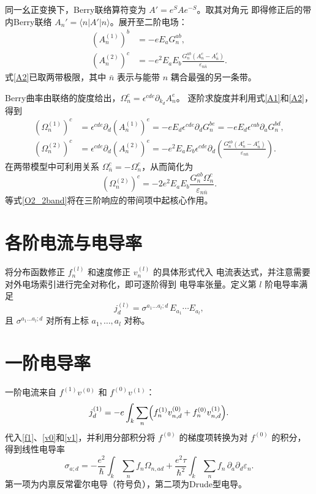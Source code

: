 同一幺正变换下，Berry联络算符变为 \(A' = e^S A e^{-S}\)。取其对角元
即得修正后的带内Berry联络 \(A_n' = \langle n|A'|n\rangle\)。展开至二阶电场：
\begin{align}
  (A_n^{(1)})^b &= -e E_a G_n^{ab}, \label{A1}\\
  (A_n^{(2)})^c &= -e^2 E_a E_b \frac{G_n^{ab}(A_n^c - A_{\bar n}^c)}{\varepsilon_{n\bar n}}.
  \label{A2}
\end{align}
式\eqref{A2}已取两带极限，其中 \(\bar n\) 表示与能带 \(n\) 耦合最强的另一条带。

Berry曲率由联络的旋度给出，\(\Omega_n^c = \epsilon^{cde}\partial_{k_d} A_n^e\)。
逐阶求旋度并利用式\eqref{A1}和\eqref{A2}，得到
\begin{align}
  (\Omega_n^{(1)})^c &= \epsilon^{cde}\partial_d (A_n^{(1)})^e
    = -e E_d \epsilon^{cde}\partial_d G_n^{be}
    = -e E_d \epsilon^{cab}\partial_a G_n^{bd}, \label{O1}\\
  (\Omega_n^{(2)})^c &= \epsilon^{cde}\partial_d (A_n^{(2)})^e
    = -e^2 E_a E_b \epsilon^{cde}\partial_d\!
    \left( \frac{G_n^{ab}(A_n^e - A_{\bar n}^e)}{\varepsilon_{n\bar n}} \right).
\end{align}
在两带模型中可利用关系 \(\Omega_{\bar n}^c = -\Omega_n^c\)，从而简化为
\begin{equation}
  (\Omega_n^{(2)})^c = -2e^2 E_a E_b \frac{G_n^{ab}\Omega_n^c}{\varepsilon_{n\bar n}}.
  \label{O2_2band}
\end{equation}
等式\eqref{O2_2band}将在三阶响应的带间项中起核心作用。

\section{各阶电流与电导率}

将分布函数修正 \(f_n^{(l)}\) 和速度修正 \(v_n^{(l)}\) 的具体形式代入
电流表达式，并注意需要对外电场索引进行完全对称化，即可逐阶得到
电导率张量。定义第 \(l\) 阶电导率满足
\begin{equation}
  j_d^{(l)} = \sigma^{a_1\dots a_l;d}\, E_{a_1}\cdots E_{a_l},
  \label{sigma_def}
\end{equation}
且 \(\sigma^{a_1\dots a_l;d}\) 对所有上标 \(a_1,\dots,a_l\) 对称。

\section{一阶电导率}

一阶电流来自 \(f^{(1)}v^{(0)}\) 和 \(f^{(0)}v^{(1)}\)：
\begin{equation}
  j_d^{(1)} = -e\int_k\sum_n
  \Bigl( f_n^{(1)} v_{n,d}^{(0)} + f_n^{(0)} v_{n,d}^{(1)} \Bigr).
\end{equation}
代入\eqref{f1}、\eqref{v0}和\eqref{v1}，并利用分部积分将
\(f^{(0)}\) 的梯度项转换为对 \(f^{(0)}\) 的积分，得到线性电导率
\begin{equation}
  \sigma_{a;d} = -\frac{e^2}{\hbar} \int_k \sum_n f_n \Omega_{n,ad}
  + \frac{e^2\tau}{\hbar^2} \int_k \sum_n f_n \,\partial_a\partial_d\varepsilon_n .
  \label{sigma1}
\end{equation}
第一项为内禀反常霍尔电导（符号负），第二项为Drude型电导。

